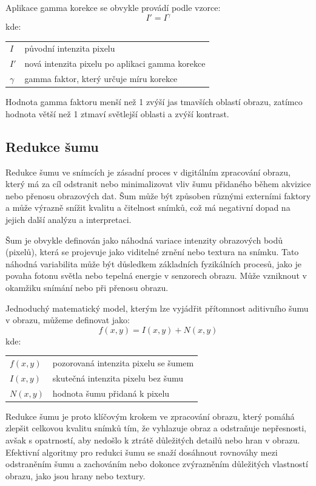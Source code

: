 \documentclass[male,czech,api_ing]{thesis}
\makeatletter
\newenvironment{conditions}[1][kde:]
    {#1 \begin{tabular}[t]{>{$}l<{$} @{${}={}$} >{\raggedright\arraybackslash}p{10cm}}}
    {\end{tabular}}
\makeatother
\begin{document}
Aplikace gamma korekce se obvykle provádí podle vzorce:
\begin{equation}
    I' = I^\gamma
\end{equation}
\begin{conditions}
    I &  původní intenzita pixelu \\
    I' & nová intenzita pixelu po aplikaci gamma korekce \\
    \gamma & gamma faktor, který určuje míru korekce
\end{conditions}

Hodnota gamma faktoru menší než 1 zvýší jas tmavších oblastí obrazu, zatímco hodnota větší než 1 ztmaví světlejší oblasti a zvýší kontrast.
 
\subsection{Redukce šumu}
Redukce šumu ve snímcích je zásadní proces v digitálním zpracování obrazu, který má za cíl odstranit nebo minimalizovat vliv šumu přidaného během akvizice nebo přenosu obrazových dat. Šum může být způsoben různými externími faktory a může výrazně snížit kvalitu a čitelnost snímků, což má negativní dopad na jejich další analýzu a interpretaci.

Šum je obvykle definován jako náhodná variace intenzity obrazových bodů (pixelů), která se projevuje jako viditelné zrnění nebo textura na snímku. Tato náhodná variabilita může být důsledkem základních fyzikálních procesů, jako je povaha fotonu světla nebo tepelná energie v senzorech obrazu. Může vzniknout v okamžiku snímání nebo při přenosu obrazu.

Jednoduchý matematický model, kterým lze vyjádřit přítomnost aditivního šumu v obrazu, můžeme definovat jako:
\begin{equation}
    f(x, y) = I(x, y) + N(x, y)
\end{equation}
\begin{conditions}
    f(x, y) & pozorovaná intenzita pixelu se šumem \\
    I(x, y) & skutečná intenzita pixelu bez šumu \\
    N(x, y) & hodnota šumu přidaná k pixelu
\end{conditions}

Redukce šumu je proto klíčovým krokem ve zpracování obrazu, který pomáhá zlepšit celkovou kvalitu snímků tím, že vyhlazuje obraz a odstraňuje nepřesnosti, avšak s opatrností, aby nedošlo k ztrátě důležitých detailů nebo hran v obrazu. Efektivní algoritmy pro redukci šumu se snaží dosáhnout rovnováhy mezi odstraněním šumu a zachováním nebo dokonce zvýrazněním důležitých vlastností obrazu, jako jsou hrany nebo textury. \cite{ImageDenoisingTechniques,ImageNoiseReductionIran}
\end{document}
